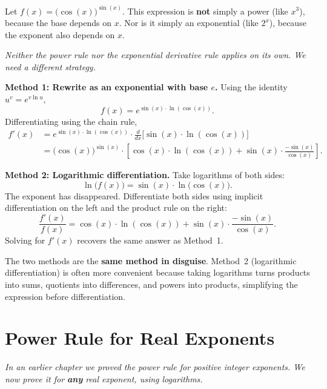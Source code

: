 \begin{example}
\label{ex:4-4}
Let $f(x) = \bigl(\cos(x)\bigr)^{\sin(x)}$.  This expression is \textbf{not} simply a power (like $x^{3}$), because the base depends on $x$.  Nor is it simply an exponential (like $2^{x}$), because the exponent also depends on $x$.

\textit{Neither the power rule nor the exponential derivative rule applies on its own.  We need a different strategy.}

\textbf{Method 1: Rewrite as an exponential with base $e$.} Using the identity $u^{v} = e^{v \ln u}$,
\[
  f(x) = e^{\sin(x) \cdot \ln(\cos(x))}.
\]
Differentiating using the chain rule,
\begin{align*}
  f'(x)
  &= e^{\sin(x) \cdot \ln(\cos(x))} \cdot \frac{d}{dx}\bigl[\sin(x) \cdot \ln(\cos(x))\bigr] \\
  &= \bigl(\cos(x)\bigr)^{\sin(x)} \cdot \left[\cos(x) \cdot \ln(\cos(x)) + \sin(x) \cdot \frac{-\sin(x)}{\cos(x)}\right].
\end{align*}

\textbf{Method 2: Logarithmic differentiation.}  Take logarithms of both sides:
\[
  \ln\!\bigl(f(x)\bigr) = \sin(x) \cdot \ln\!\bigl(\cos(x)\bigr).
\]
The exponent has disappeared.  Differentiate both sides using implicit differentiation on the left and the product rule on the right:
\[
  \frac{f'(x)}{f(x)} = \cos(x) \cdot \ln(\cos(x)) + \sin(x) \cdot \frac{-\sin(x)}{\cos(x)}.
\]
Solving for $f'(x)$ recovers the same answer as Method~1.
\end{example}

\begin{remark}
The two methods are the \textbf{same method in disguise}.  Method~2 (logarithmic differentiation) is often more convenient because taking logarithms turns products into sums, quotients into differences, and powers into products, simplifying the expression before differentiation.
\end{remark}

\section{Power Rule for Real Exponents}
\label{sec:4.10}

\textit{In an earlier chapter we proved the power rule for positive integer exponents.  We now prove it for \textbf{any} real exponent, using logarithms.}

